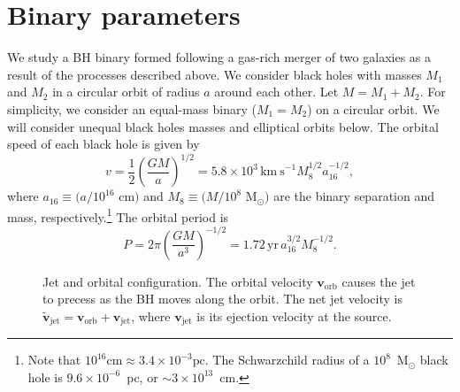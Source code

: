 \documentclass[iop]{emulateapj}
\begin{document}
\section{Binary parameters}

We study a BH binary formed following a gas-rich merger of two
galaxies as a result of the processes described above.  We consider
black holes with masses $M_1$ and $M_2$ in a circular orbit of radius
$a$ around each other.  Let $M=M_1+M_2$.  For simplicity, we consider
an equal-mass binary ($M_1=M_2$) on a circular orbit. We will consider
unequal black holes masses and elliptical orbits below.  The orbital
speed of each black hole is given by \citep{2010PhRvD..81d7503L}
\begin{equation}
  v = \frac{1}{2}\left(\frac{GM}{a}\right)^{1/2}\!\!\!\! = 5.8\times 10^3\, \mathrm{km~s}^{-1}M_8^{1/2}a_{16}^{-1/2},
  \label{eqn:vorb}
\end{equation}
where $a_{16}\equiv (a/10^{16}$ cm$)$ and $M_8\equiv (M/10^8$
M$_\odot)$ are the binary separation and mass,
respectively.\footnote{Note that $10^{16} \mathrm{cm}\approx 3.4\times
  10^{-3} \mathrm{pc}$.  The Schwarzchild radius of a $10^8$~M$_\odot$
  black hole is $9.6\times 10^{-6}$~pc, or $\sim 3\times 10^{13}$~cm.}
The orbital period is
\begin{equation}
  P = 2\pi\left(\frac{GM}{a^3}\right)^{-1/2}\!\!\!\! = 1.72\, \mathrm{yr}\, a_{16}^{3/2} M_8^{-1/2}.
\end{equation}

\begin{figure}
  \begin{center}
  \end{center}
  \caption{Jet and orbital configuration. The orbital velocity
    $\mathbf{v}_\mathrm{orb}$ causes the jet to precess as the BH
    moves along the orbit. The net jet velocity is
    $\tilde{\mathbf{v}}_\mathrm{jet}={\mathbf{v}}_\mathrm{orb}+{\mathbf{v}}_\mathrm{jet}$,
    where $\mathbf{v}_\mathrm{jet}$ is its ejection velocity at the
    source.}
  \label{fig:BH_orbit}
\end{figure}
\end{document}
